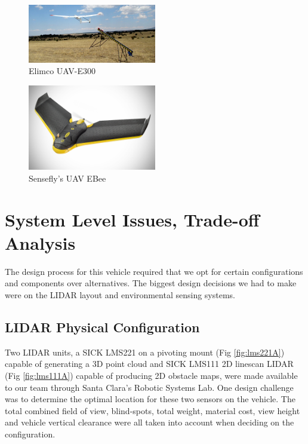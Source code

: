 \begin{figure}[H]
\centering
\includegraphics[width=0.5\textwidth]{UAV-E300.jpg}
\caption{Elimco UAV-E300}
\label{fig:ElimcoUAVE3001}
\end{figure}

\begin{figure}[H]
\centering
\includegraphics[width=0.5\textwidth]{e-bee.jpg}
\caption{Sensefly's UAV EBee}
\label{fig:SenseflyEBee1}
\end{figure}
%
\section{System Level Issues, Trade-off Analysis}
The design process for this vehicle required that we opt for certain configurations and components over alternatives. The biggest design decisions we had to make were on the LIDAR layout and environmental sensing systems.\\

\subsection{LIDAR Physical Configuration}

Two LIDAR units, a SICK LMS221 on a pivoting mount (Fig \ref{fig:lms221A}) capable of generating a 3D point cloud and SICK LMS111 2D linescan LIDAR (Fig \ref{fig:lms111A}) capable of producing 2D obstacle maps, were made available to our team through Santa Clara's  Robotic Systems Lab. One design challenge was to determine the optimal location for these two sensors on the vehicle. The total combined field of view, blind-spots, total weight, material cost, view height and vehicle vertical clearance were all taken into account when deciding on the configuration. 

